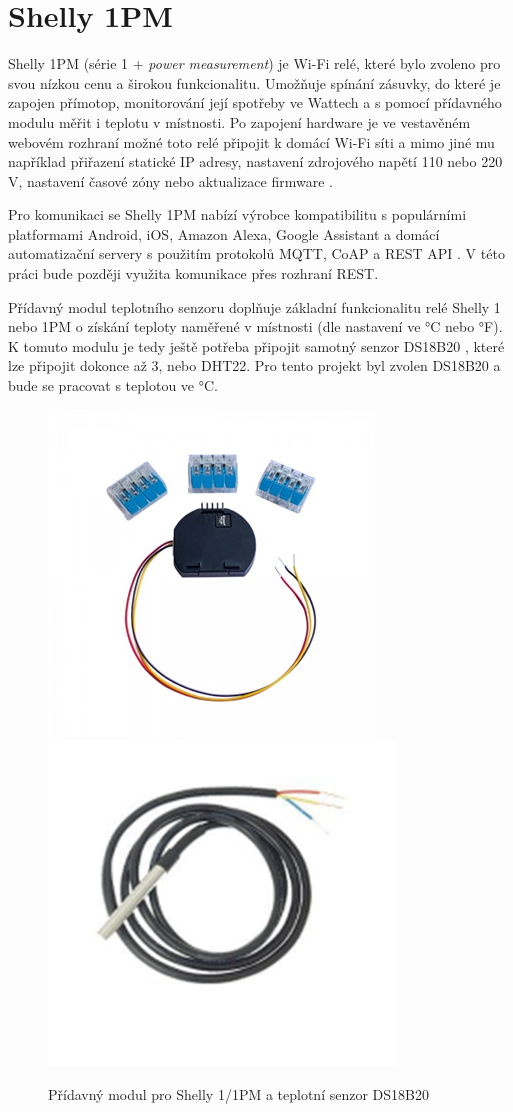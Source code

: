 \section{Shelly 1PM}
\label{navrh-shelly}
Shelly 1PM (série 1 + {\it power measurement}) je Wi-Fi relé, které bylo zvoleno pro svou nízkou cenu a širokou funkcionalitu. Umožňuje spínání zásuvky, do které je zapojen přímotop, monitorování její spotřeby ve Wattech a s pomocí přídavného modulu měřit i teplotu v místnosti. Po zapojení hardware je ve vestavěném webovém rozhraní možné toto relé připojit k domácí Wi-Fi síti a mimo jiné mu například přiřazení statické IP adresy, nastavení zdrojového napětí 110 nebo 220 V, nastavení časové zóny nebo aktualizace firmware \cite{shelly_1pm}.

Pro komunikaci se Shelly 1PM nabízí výrobce kompatibilitu s populárními platformami Android, iOS, Amazon Alexa, Google Assistant a domácí automatizační servery s použitím protokolů MQTT, CoAP a REST API \cite{shelly_1pm}. V této práci bude později využita komunikace přes rozhraní REST.

Přídavný modul teplotního senzoru \cite{shelly_tempaddon} doplňuje základní funkcionalitu relé Shelly 1 nebo 1PM o získání teploty naměřené v místnosti (dle nastavení ve °C nebo °F). K tomuto modulu je tedy ještě potřeba připojit samotný senzor DS18B20 \cite{shelly_tempsensor}, které lze připojit dokonce až 3, nebo DHT22. Pro tento projekt byl zvolen DS18B20 a bude se pracovat s teplotou ve °C.

\begin{figure}[hbt]
\centering
\includegraphics[width=0.33\linewidth]{obrazky-figures/shelly-tempaddon.png}
\includegraphics[width=0.33\linewidth]{obrazky-figures/shelly-tempsensor.png}
\caption{Přídavný modul pro Shelly 1/1PM a teplotní senzor DS18B20}
\end{figure}

